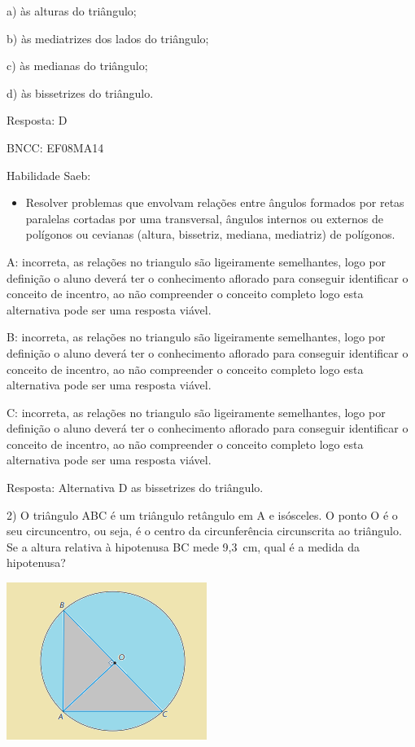 a) às alturas do triângulo;

b) às mediatrizes dos lados do triângulo;

c) às medianas do triângulo;

d) às bissetrizes do triângulo.

Resposta: D

BNCC: EF08MA14

Habilidade Saeb:

\begin{itemize}
\tightlist
\item
  Resolver problemas que envolvam relações entre ângulos formados por
  retas paralelas cortadas por uma transversal, ângulos internos ou
  externos de polígonos ou cevianas (altura, bissetriz, mediana,
  mediatriz) de polígonos.
\end{itemize}

A: incorreta, as relações no triangulo são ligeiramente semelhantes,
logo por definição o aluno deverá ter o conhecimento aflorado para
conseguir identificar o conceito de incentro, ao não compreender o
conceito completo logo esta alternativa pode ser uma resposta viável.

B: incorreta, as relações no triangulo são ligeiramente semelhantes,
logo por definição o aluno deverá ter o conhecimento aflorado para
conseguir identificar o conceito de incentro, ao não compreender o
conceito completo logo esta alternativa pode ser uma resposta viável.

C: incorreta, as relações no triangulo são ligeiramente semelhantes,
logo por definição o aluno deverá ter o conhecimento aflorado para
conseguir identificar o conceito de incentro, ao não compreender o
conceito completo logo esta alternativa pode ser uma resposta viável.

Resposta: Alternativa D as bissetrizes do triângulo.

2) O triângulo ABC é um triângulo retângulo em A e isósceles. O ponto O
é o seu circuncentro, ou seja, é o centro da circunferência circunscrita
ao triângulo. Se a altura relativa à hipotenusa BC mede 9,3~cm, qual é a
medida da hipotenusa?

\includegraphics[width=2.5625in,height=2.02083in]{./imgSAEB_8_MAT/media/image35.png}

